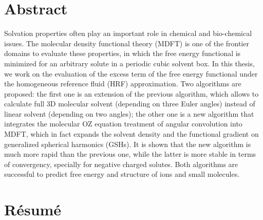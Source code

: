\begingroup
\let\clearpage\relax
\let\cleardoublepage\relax


\chapter*{Abstract}

Solvation properties often play an important role in chemical and
bio-chemical issues. The molecular density functional theory (\acs{MDFT})
is one of the frontier domains to evaluate these properties, in which
the free energy functional is minimized for an arbitrary solute in
a periodic cubic solvent box. In this thesis, we work on the evaluation
of the excess term of the free energy functional under the homogeneous
reference fluid (\acs{HRF}) approximation. Two algorithms are proposed:
the first one is an extension of the previous algorithm, which allows
to calculate full 3D molecular solvent (depending on three Euler angles)
instead of linear solvent (depending on two angles); the other one
is a new algorithm that integrates the molecular \acs{OZ} equation
treatment of angular convolution into \acs{MDFT}, which in fact expands
the solvent density and the functional gradient on generalized spherical
harmonics (\acs{GSH}s). It is shown that the new algorithm is much
more rapid than the previous one, while the latter is more stable
in terms of convergency, specially for negative charged solutes. Both
algorithms are successful to predict free energy and structure of
ions and small molecules. 

\vfill{}


\chapter*{Résumé}

\vfill{}

\endgroup
